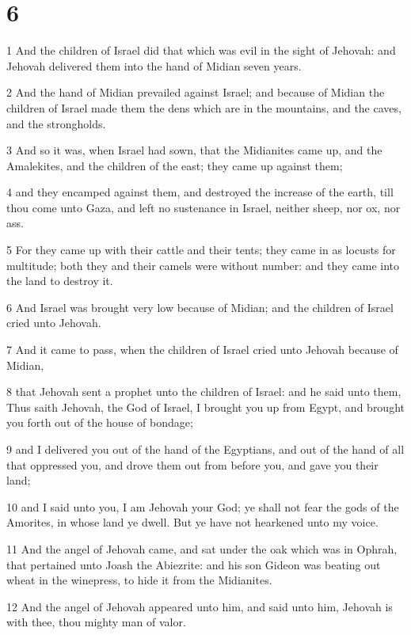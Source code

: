 \chapter{6}

\par 1 And the children of Israel did that which was evil in the sight of Jehovah: and Jehovah delivered them into the hand of Midian seven years.
\par 2 And the hand of Midian prevailed against Israel; and because of Midian the children of Israel made them the dens which are in the mountains, and the caves, and the strongholds.
\par 3 And so it was, when Israel had sown, that the Midianites came up, and the Amalekites, and the children of the east; they came up against them;
\par 4 and they encamped against them, and destroyed the increase of the earth, till thou come unto Gaza, and left no sustenance in Israel, neither sheep, nor ox, nor ass.
\par 5 For they came up with their cattle and their tents; they came in as locusts for multitude; both they and their camels were without number: and they came into the land to destroy it.
\par 6 And Israel was brought very low because of Midian; and the children of Israel cried unto Jehovah.
\par 7 And it came to pass, when the children of Israel cried unto Jehovah because of Midian,
\par 8 that Jehovah sent a prophet unto the children of Israel: and he said unto them, Thus saith Jehovah, the God of Israel, I brought you up from Egypt, and brought you forth out of the house of bondage;
\par 9 and I delivered you out of the hand of the Egyptians, and out of the hand of all that oppressed you, and drove them out from before you, and gave you their land;
\par 10 and I said unto you, I am Jehovah your God; ye shall not fear the gods of the Amorites, in whose land ye dwell. But ye have not hearkened unto my voice.
\par 11 And the angel of Jehovah came, and sat under the oak which was in Ophrah, that pertained unto Joash the Abiezrite: and his son Gideon was beating out wheat in the winepress, to hide it from the Midianites.
\par 12 And the angel of Jehovah appeared unto him, and said unto him, Jehovah is with thee, thou mighty man of valor.
